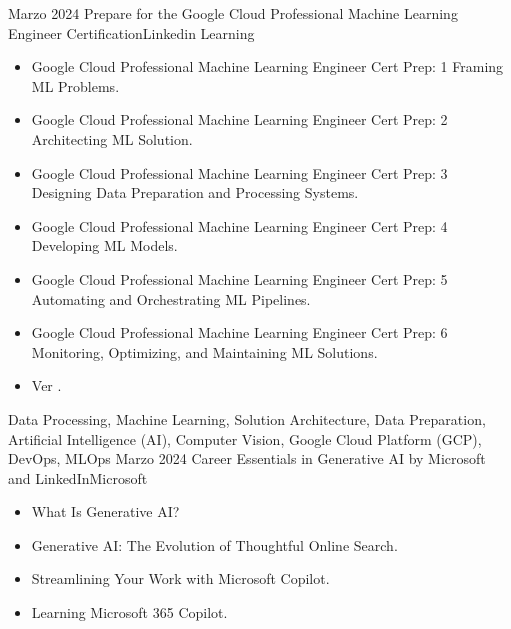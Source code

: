 




\begin{certs}
  \cert
    {Marzo 2024} {Prepare for the Google Cloud Professional Machine Learning Engineer Certification}{Linkedin Learning}{}
    {}    {
      \begin{itemize}
        \item Google Cloud Professional Machine Learning Engineer Cert Prep: 1 Framing ML Problems.
        \item Google Cloud Professional Machine Learning Engineer Cert Prep: 2 Architecting ML Solution.
        \item Google Cloud Professional Machine Learning Engineer Cert Prep: 3 Designing Data Preparation and Processing Systems.
        \item Google Cloud Professional Machine Learning Engineer Cert Prep: 4 Developing ML Models.
        \item Google Cloud Professional Machine Learning Engineer Cert Prep: 5 Automating and Orchestrating ML Pipelines.
        \item Google Cloud Professional Machine Learning Engineer Cert Prep: 6 Monitoring, Optimizing, and Maintaining ML Solutions.
        \item Ver \href{https://www.linkedin.com/learning/certificates/64b7df30df810f9d340be254d70913a73bb7955c40502e8f248613ceb1cf5c4e}{\color{CadetBlue}{Certificado}}.
      \end{itemize}
    }
    {Data Processing, Machine Learning, Solution Architecture, Data Preparation, Artificial Intelligence (AI), Computer Vision, Google Cloud Platform (GCP), DevOps, MLOps}
    \emptySeparator
    \cert
    {Marzo 2024} {Career Essentials in Generative AI by Microsoft and LinkedIn}{Microsoft}{}
    {}    {
      \begin{itemize}
        \item What Is Generative AI?
        \item Generative AI: The Evolution of Thoughtful Online Search.
        \item Streamlining Your Work with Microsoft Copilot.
        \item Learning Microsoft 365 Copilot.

\end{itemize}}
\end{certs}
